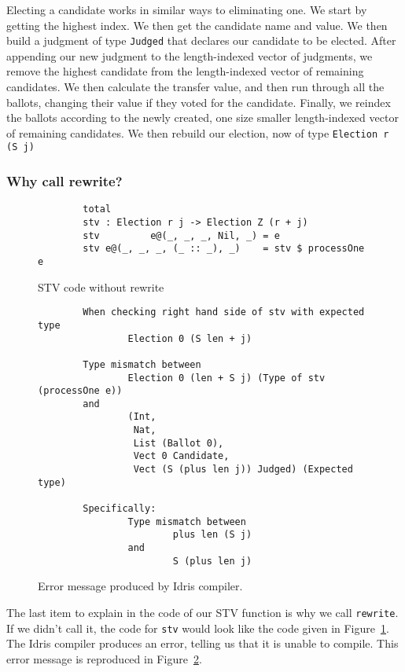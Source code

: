 Electing a candidate works in similar ways to eliminating one. We start by
getting the highest index. We then get the candidate name and value. We then
build a judgment of type \texttt{Judged} that declares our candidate to be
elected. After appending our new judgment to the length-indexed vector of
judgments, we remove the highest candidate from the length-indexed vector of
remaining candidates. We then calculate the transfer value, and then run through
all the ballots, changing their value if they voted for the candidate. Finally,
we reindex the ballots according to the newly created, one size smaller
length-indexed vector of remaining candidates. We then rebuild our election, now
of type \texttt{Election r (S j)}

\subsubsection{Why call rewrite?}


\begin{figure}[ht!!!!!!!!]
	\caption{STV code without rewrite}
	\label{no_rewrite_code}
    \begin{lstlisting}
        total
        stv : Election r j -> Election Z (r + j)
        stv         e@(_, _, _, Nil, _) = e
        stv e@(_, _, _, (_ :: _), _)    = stv $ processOne e
    \end{lstlisting}
\end{figure}

\begin{figure}[ht!!!!!!!!]
	\caption{Error message produced by Idris compiler.}
	\label{idris_error_code}
    \begin{lstlisting}
        When checking right hand side of stv with expected type
                Election 0 (S len + j)

        Type mismatch between
                Election 0 (len + S j) (Type of stv (processOne e))
        and
                (Int,
                 Nat,
                 List (Ballot 0),
                 Vect 0 Candidate,
                 Vect (S (plus len j)) Judged) (Expected type)

        Specifically:
                Type mismatch between
                        plus len (S j)
                and
                        S (plus len j)
    \end{lstlisting}
\end{figure}

The last item to explain in the code of our STV function is why we call
\texttt{rewrite}. If we didn't call it, the code for \texttt{stv} would look
like the code given in Figure~\ref{no_rewrite_code}. The Idris compiler produces
an error, telling us that it is unable to compile. This error message is
reproduced in Figure~\ref{idris_error_code}.

